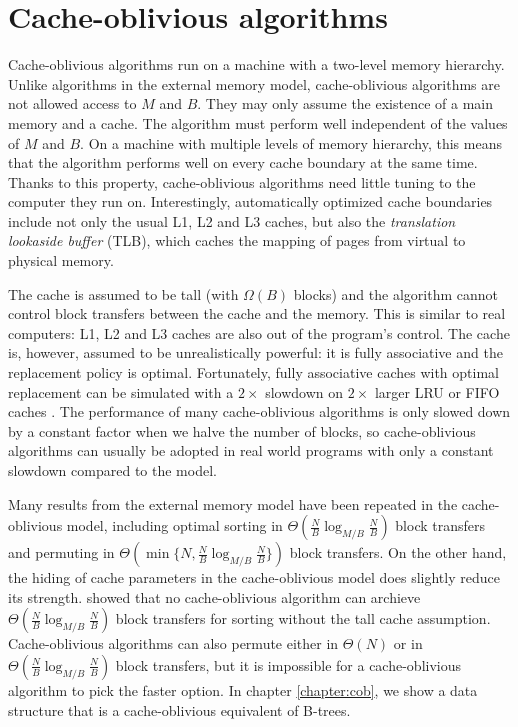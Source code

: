 \section{Cache-oblivious algorithms}
Cache-oblivious algorithms run on a machine with a two-level memory hierarchy.
Unlike algorithms in the external memory model, cache-oblivious algorithms
are not allowed access to $M$ and $B$. They may only assume the existence
of a main memory and a cache.
The algorithm must perform well independent of the values of $M$ and $B$.
On a machine with multiple levels of memory hierarchy, this means that
the algorithm performs well on every cache boundary at the same time.
Thanks to this property, cache-oblivious algorithms need little tuning to the
computer they run on. Interestingly, automatically optimized cache boundaries
include not only the usual L1, L2 and L3 caches, but also the \emph{translation
lookaside buffer} (TLB), which caches the mapping of pages from virtual to
physical memory.

The cache is assumed to be tall (with $\Omega(B)$ blocks) and
the algorithm cannot control block transfers between the cache and the memory.
This is similar to real computers: L1, L2 and L3 caches are also out
of the program's control.
The cache is, however, assumed to be unrealistically powerful: it is fully
associative and the replacement policy is optimal. Fortunately, fully
associative caches with optimal replacement can be simulated with a
$2\times$ slowdown on $2\times$ larger LRU or FIFO caches
\cite{sleator1985amortized}.
The performance of many cache-oblivious algorithms is only slowed down
by a constant factor when we halve the number of blocks, so cache-oblivious
algorithms can usually be adopted in real world programs with only a constant
slowdown compared to the model.

Many results from the external memory model have been repeated in the
cache-oblivious model, including optimal sorting in
$\Theta(\frac{N}{B}\log_{M/B}\frac{N}{B})$ block transfers and permuting
in $\Theta(\min\{N,\frac{N}{B}\log_{M/B}\frac{N}{B}\})$ block transfers.
On the other hand, the hiding of cache parameters in the cache-oblivious model
does slightly reduce its strength. \cite{limits-of-co} showed that no
cache-oblivious algorithm can archieve
$\Theta(\frac{N}{B}\log_{M/B}\frac{N}{B})$ block transfers for sorting
without the tall cache assumption. Cache-oblivious algorithms can also permute
either in $\Theta(N)$ or in $\Theta(\frac{N}{B}\log_{M/B}\frac{N}{B})$ block
transfers, but it is impossible for a cache-oblivious algorithm to pick
the faster option.
In chapter \ref{chapter:cob}, we show a data structure that is a cache-oblivious
equivalent of B-trees.
